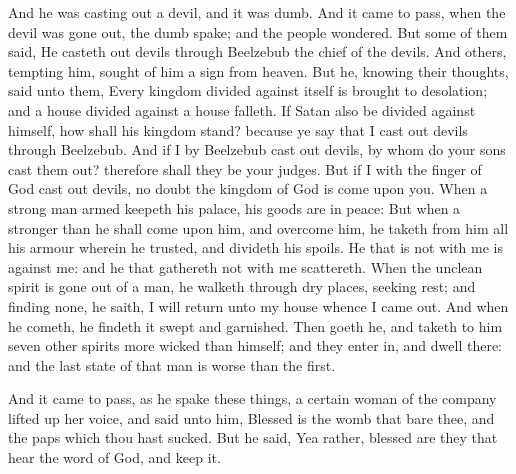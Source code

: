  And he was casting out a devil, and it was dumb. And it
came to pass, when the devil was gone out, the dumb spake; and the
people wondered.  But some of them said, He casteth out
devils through Beelzebub the chief of the devils.  And
others, tempting him, sought of him a sign from heaven. 
But he, knowing their thoughts, said unto them, Every kingdom divided
against itself is brought to desolation; and a house divided against a
house falleth.  If Satan also be divided against himself,
how shall his kingdom stand? because ye say that I cast out devils
through Beelzebub.  And if I by Beelzebub cast out
devils, by whom do your sons cast them out? therefore shall they be your
judges.  But if I with the finger of God cast out devils,
no doubt the kingdom of God is come upon you.  When a
strong man armed keepeth his palace, his goods are in peace:
 But when a stronger than he shall come upon him, and
overcome him, he taketh from him all his armour wherein he trusted, and
divideth his spoils.  He that is not with me is against
me: and he that gathereth not with me scattereth.  When
the unclean spirit is gone out of a man, he walketh through dry places,
seeking rest; and finding none, he saith, I will return unto my house
whence I came out.  And when he cometh, he findeth it
swept and garnished.  Then goeth he, and taketh to him
seven other spirits more wicked than himself; and they enter in, and
dwell there: and the last state of that man is worse than the first.

 And it came to pass, as he spake these things, a certain
woman of the company lifted up her voice, and said unto him, Blessed is
the womb that bare thee, and the paps which thou hast sucked.
 But he said, Yea rather, blessed are they that hear the
word of God, and keep it.

